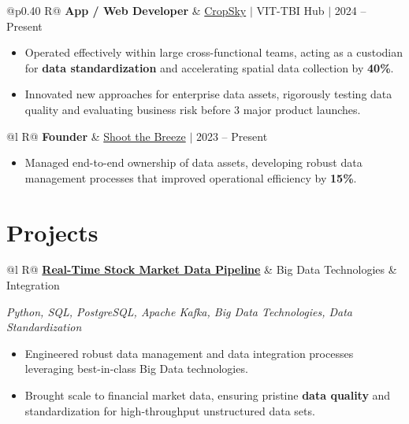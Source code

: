 \documentclass[a4paper,10pt]{article}
\newcommand{\ulink}[2]{\href{#1}{#2}}
\newcommand{\subheading}[1]{{\color[HTML]{0A0A0A}\fontsize{12}{14}\selectfont\bfseries #1}}
\newcommand{\techstack}[1]{{\color[HTML]{5C5C5C}\fontsize{10.5}{12.5}\selectfont\itshape #1}}
\newcommand{\meta}[1]{{\color[HTML]{5C5C5C}\fontsize{10.5}{12.5}\selectfont #1}}
\begin{document}
\begin{tabularx}{\linewidth}{@{}p{0.40\linewidth} R@{}}
\subheading{App / Web Developer} & \meta{\ulink{https://sites.google.com/view/cropsky/home}{CropSky} $|$ VIT-TBI Hub $|$ 2024 -- Present}
\end{tabularx}
\begin{itemize}[nosep, leftmargin=1.5em, itemsep=2pt, topsep=2pt]
  \item {\color[HTML]{0A0A0A}\fontsize{11}{14}\selectfont Operated effectively within large cross-functional teams, acting as a custodian for \textbf{data standardization} and accelerating spatial data collection by \textbf{40\%}.}
  \item {\color[HTML]{0A0A0A}\fontsize{11}{14}\selectfont Innovated new approaches for enterprise data assets, rigorously testing data quality and evaluating business risk before 3 major product launches.}
\end{itemize}

\begin{tabularx}{\linewidth}{@{}l R@{}}
\subheading{Founder} & \meta{\ulink{https://shoot-the-breeze.vercel.app}{Shoot the Breeze} $|$ 2023 -- Present}
\end{tabularx}
\begin{itemize}[nosep, leftmargin=1.5em, itemsep=2pt, topsep=2pt]
  \item {\color[HTML]{0A0A0A}\fontsize{11}{14}\selectfont Managed end-to-end ownership of data assets, developing robust data management processes that improved operational efficiency by \textbf{15\%}.}
\end{itemize}

\section{Projects}
\vspace{2pt}

\begin{tabularx}{\linewidth}{@{}l R@{}}
\subheading{\ulink{https://github.com/su-jin1425/Real-Time-Stock-Market-Data-Pipeline}{Real-Time Stock Market Data Pipeline}} & \meta{Big Data Technologies \& Integration}
\end{tabularx}
\techstack{Python, SQL, PostgreSQL, Apache Kafka, Big Data Technologies, Data Standardization}
\begin{itemize}[nosep, leftmargin=1.5em, itemsep=2pt, topsep=2pt]
  \item {\color[HTML]{0A0A0A}\fontsize{11}{14}\selectfont Engineered robust data management and data integration processes leveraging best-in-class Big Data technologies.}
  \item {\color[HTML]{0A0A0A}\fontsize{11}{14}\selectfont Brought scale to financial market data, ensuring pristine \textbf{data quality} and standardization for high-throughput unstructured data sets.}
\end{itemize}
\end{document}
